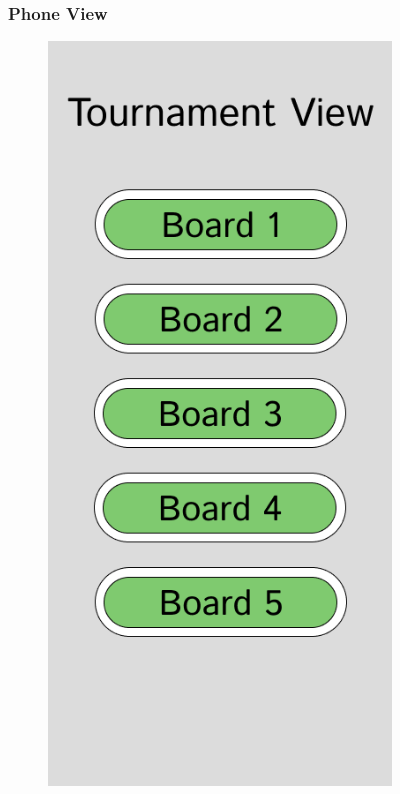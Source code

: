 \begin{figure}[h!]
\subsubsection*{Phone View}
    \centering
    \begin{subfigure}[h!]{0.2\linewidth}
        \centering
        \includegraphics[width=\linewidth]{figures/methods/wireframes/phone-tournament-view.png}

\end{subfigure}
\end{figure}
